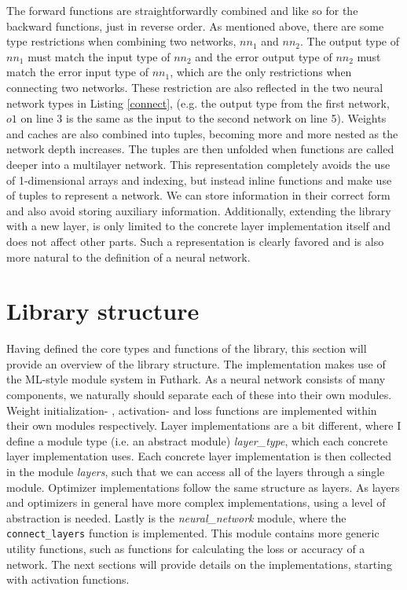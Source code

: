 The forward functions are straightforwardly combined and like so for the
backward functions, just in reverse order. 
As mentioned above, there are some type restrictions when combining two
networks, $nn_1$ and $nn_2$. 
The output type of $nn_1$ {must} match the input type of $nn_2$ {and} the error
output type of $nn_2$ must match the error input type of $nn_1$, which are the
only restrictions when connecting two networks. 
These restriction are also reflected in the two neural network types in Listing
\ref{connect}, (e.g. the output type from the first network, $o1$ on line 3 is
the same as the input to the second network on line 5). 
Weights and caches are also combined into tuples, becoming more and more nested
as the network depth increases. 
The tuples are then unfolded when functions are called deeper into a multilayer
network. 
This representation completely avoids the use of 1-dimensional arrays and
indexing, but instead inline functions and make use of tuples to represent a
network. 
We can store information in their correct form and also avoid storing auxiliary
information. 
Additionally, extending the library with a new layer, is only limited to the
concrete layer implementation itself and does not affect other parts. 
Such a representation is clearly favored and is also more natural to the
definition of a neural network. 

\section{Library structure}
Having defined the core types and functions of the library, this section will
provide an overview of the library structure. 
The implementation makes use of the ML-style module system in Futhark. 
As a neural network consists of many components, we naturally should separate
each of these into their own modules. 
Weight initialization- , activation- and loss functions are implemented within
their own modules respectively. 
Layer implementations are a bit different, where I define a module type (i.e. an
abstract module) \emph{layer\_type}, which each concrete layer implementation
uses. 
Each concrete layer implementation is then collected in the module
\emph{layers}, such that we can access all of the layers through a single
module. Optimizer implementations follow the same structure as layers. 
As layers and optimizers in general have more complex implementations, using a
level of abstraction is needed. 
Lastly is the \emph{neural\_network} module, where the \texttt{connect\_layers}
function is implemented. 
This module contains more generic utility functions, such as functions for
calculating the loss or accuracy of a network. 
The next sections will provide details on the implementations, starting with
activation functions. 


